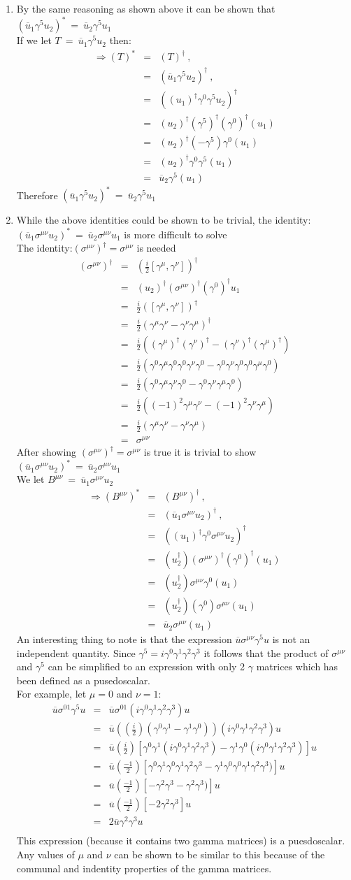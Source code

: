 \documentclass[12pt]{article}
\def \bea{\begin{eqnarray}}
\def \eea{\end{eqnarray}}
\def \nn{\nonumber}
\def \nl{\nn \\}
\def \ou{\overline{u}}
\def \ga{\gamma}
\def \si{\sigma}
\begin{document}
\begin{enumerate}
\item By the same reasoning as shown above it can be shown that $(\ou_1 \ga^5 u_2)^* ~=~ \ou_2 \ga^5 u_1$ \nl
If we let $T ~=~ \ou_1\ga^5 u_2$ then: 
\bea
\Rightarrow (T)^* &=& (T)^\dag ~,~~ \nl
&=& (\ou_1\ga^5 u_2)^\dag ~,~~ \nl
&=& ((u_1)^\dag\ga^0\ga^5 u_2)^\dag \nl
&=& (u_2)^\dag(\ga^5)^\dag (\ga^0)^\dag(u_1)\nl
&=& (u_2)^\dag(-\ga^5) \ga^0(u_1)\nl
&=& (u_2)^\dag \ga^0\ga^5(u_1)\nl
&=& \ou_2\ga^5(u_1) \nonumber
\eea \nonumber
Therefore  $(\ou_1 \ga^5 u_2)^* ~=~ \ou_2 \ga^5 u_1$

\item While the above identities could be shown to be trivial, the identity: $(\ou_1 \si^{\mu\nu} u_2)^* ~=~\ou_2 \si^{\mu\nu} u_1$ is more difficult to solve \nl
The identity:$(\si^{\mu\nu})^\dag =\si^{\mu\nu}$ is needed
\bea \nonumber
(\si^{\mu\nu})^\dag &=& (\frac{i}{2}[\ga^\mu,\ga^\nu])^\dag \nl
&=&(u_2)^\dag (\si^{\mu\nu})^\dag (\ga^0)^\dag u_1 \nl
&=& \frac{i}{2}([\ga^\mu,\ga^\nu])^\dag\nl
&=& \frac{i}{2}(\ga^\mu\ga^\nu-\ga^\nu\ga^\mu)^\dag \nl
&=& \frac{i}{2}((\ga^\mu)^\dag(\ga^\nu)^\dag-(\ga^\nu)^\dag(\ga^\mu)^\dag) \nl
&=& \frac{i}{2}(\ga^0\ga^\mu\ga^0\ga^0\ga^\nu\ga^0-\ga^0\ga^\nu\ga^0\ga^0\ga^\mu\ga^0)\nl
&=& \frac{i}{2}(\ga^0\ga^\mu\ga^\nu\ga^0-\ga^0\ga^\nu \ga^\mu\ga^0)\nl
&=& \frac{i}{2}((-1)^2\ga^\mu\ga^\nu-(-1)^2\ga^\nu \ga^\mu) \nl
&=& \frac{i}{2}(\ga^\mu\ga^\nu-\ga^\nu \ga^\mu)\nl
&=& \si^{\mu\nu}
\eea \nonumber
After showing $(\si^{\mu\nu})^\dag =\si^{\mu\nu}$ is true it is trivial to show $(\ou_1 \si^{\mu\nu} u_2)^* ~=~\ou_2 \si^{\mu\nu} u_1$ \nl
We let $B^{\mu\nu} ~=~ \ou_1 \si^{\mu\nu} u_2$ 
\bea
\Rightarrow (B^{\mu\nu})^* &=& (B^{\mu\nu})^\dag ~,~~ \nl
&=& (\ou_1 \si^{\mu\nu} u_2)^\dag ~,~~ \nl
&=& ((u_1)^\dag \ga^0 \si^{\mu\nu} u_2)^\dag \nl
&=& (u_2^\dag)(\si^{\mu\nu})^\dag (\ga^0)^\dag(u_1)\nl
&=& (u_2^\dag)\si^{\mu\nu}\ga^0(u_1)\nl
&=& (u_2^\dag)(\ga^0)\si^{\mu\nu}(u_1)\nl
&=& \ou_2 \si^{\mu\nu}(u_1) \nonumber
\eea \nonumber
An interesting thing to note is that the expression $\ou \si^{\mu\nu} \ga^5 u$ is not an independent quantity. Since $\ga^5 =i\ga^0\ga^1\ga^2\ga^3$ it follows that the product of $\si^{\mu\nu}$ and $\ga^5$ can be simplified to an expression with only 2 $\ga$ matrices which has been defined as a pusedoscalar.\nl 
For example, let $\mu =0$ and $\nu=1$:
\bea \nonumber
\ou \si^{01} \ga^5 u &=& \ou \si^{01} (i\ga^0\ga^1\ga^2\ga^3) u \nl
&=&  \ou ((\frac{i}{2})(\ga^0\ga^1 -\ga^1\ga^0)) (i\ga^0\ga^1\ga^2\ga^3) u \nl
&=&  \ou (\frac{i}{2})[\ga^0\ga^1(i\ga^0\ga^1\ga^2\ga^3) -\ga^1\ga^0(i\ga^0\ga^1\ga^2\ga^3)] u \nl
&=&  \ou (\frac{-1}{2})[\ga^0\ga^1\ga^0\ga^1\ga^2\ga^3 -\ga^1\ga^0\ga^0\ga^1\ga^2\ga^3)] u \nl
&=& \ou (\frac{-1}{2})[-\ga^2\ga^3 -\ga^2\ga^3)] u\nl
&=& \ou (\frac{-1}{2})[-2\ga^2\ga^3] u\nl
&=& 2\ou \ga^2\ga^3 u\nl \nonumber
\eea \nonumber
This expression (because it contains two gamma matrices) is a puesdoscalar. Any values of $\mu$ and $\nu$ can be shown to be similar to this because of the communal and indentity properties of the gamma matrices. 


\end{enumerate}
\end{document}
